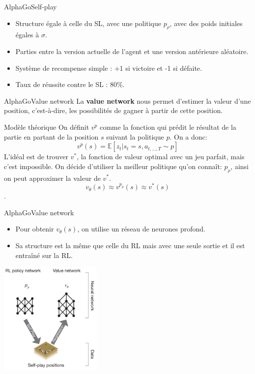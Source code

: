 \begin{frame}{AlphaGo}{Self-play}

    \begin{itemize}
        \item Structure égale à celle du SL, avec une politique $p_\rho$, avec des poids initiales égales à $\sigma$.
        \item Parties entre la version actuelle de l'agent et une version antérieure aléatoire.
        \item Système de recompense simple : +1 si victoire et -1 si défaite.
        \item Taux de réussite contre le SL : 80\%.
    \end{itemize}

\end{frame}


\begin{frame}{AlphaGo}{Value network}
    La \textbf{value network} nous permet d'estimer la valeur d'une position, c'est-à-dire, les possibilités de gagner à partir de cette position.
    \begin{block}{Modèle théorique}
        On définit $v^p$ comme la fonction qui prédit le résultat de la partie en partant de la position $s$ suivant la politique $p$. On a donc: $$v^p(s) = \mathbb{E}[z_t|s_t=s, a_{t,\dots,T}\sim p]$$
        L'idéal est de trouver $v^*$, la fonction de valeur optimal avec un jeu parfait, mais c'est impossible.
        On décide d'utiliser la meilleur politique qu'on connaît: $p_\rho$, ainsi on peut approximer la valeur de $v^*$. $$v_\theta(s) \approx v^{p_\rho}(s) \approx v^*(s)$$.
    \end{block}
\end{frame}

\begin{frame}{AlphaGo}{Value network}
    \begin{itemize}
        \item Pour obtenir $v_\theta(s)$, on utilise un réseau de neurones profond.
        \item Sa structure est la même que celle du RL mais avec une seule sortie et il est entraîné sur la RL.
    \end{itemize}
    \begin{center}
        \includegraphics[width=5cm]{ressources/AlphaGo/RL_and_VN}
    \end{center}
\end{frame}

